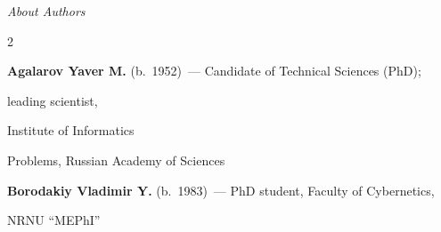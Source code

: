 


\begin{center}\LARGE

\textit{About Authors}

\end{center}

\thispagestyle{empty}



\vspace*{24pt}





\begin{multicols}{2}



\noindent

\textbf{Agalarov Yaver M.} (b.\ 1952)~--- Candidate of Technical Sciences (PhD); 

leading scientist,

Institute of Informatics

Problems, Russian Academy of Sciences













\vspace*{6pt}



\noindent

\textbf{Borodakiy Vladimir Y.} (b.\ 1983)~--- PhD student, Faculty of Cybernetics,

NRNU ``MEPhI''









\end{multicols}
